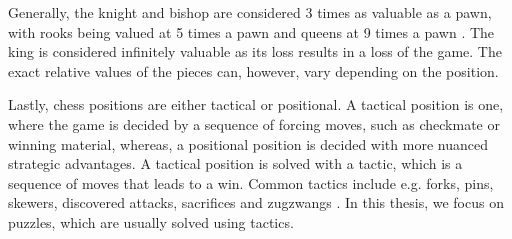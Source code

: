 Generally, the knight and bishop are considered 3 times as valuable as a pawn, with rooks being valued at 5 times a pawn and queens at 9 times a pawn \cite{piecevalues}. The king is considered infinitely valuable as its loss results in a loss of the game. The exact relative values of the pieces can, however, vary depending on the position.

Lastly, chess positions are either tactical or positional. A tactical position is one, where the game is decided by a sequence of forcing moves, such as checkmate or winning material, whereas, a positional position is decided with more nuanced strategic advantages. A tactical position is solved with a tactic, which is a sequence of moves that leads to a win. Common tactics include e.g. forks, pins, skewers, discovered attacks, sacrifices and zugzwangs \cite{tactics}. In this thesis, we focus on puzzles, which are usually solved using tactics.
